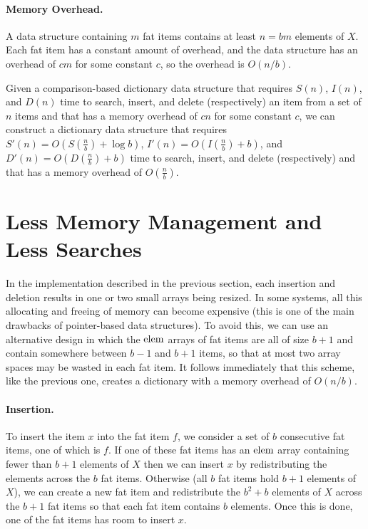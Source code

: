 \documentclass[lotsofwhite]{patmorin}
\begin{document}
\paragraph{Memory Overhead.}

A data structure containing $m$ fat items contains at least $n=bm$
elements of $X$.  Each fat item has a constant amount of overhead, and
the data structure has an overhead of $cm$ for some constant $c$, so
the overhead is $O(n/b)$.

\begin{thm}
Given a comparison-based dictionary data structure that requires
$S(n)$, $I(n)$, and $D(n)$ time to search, insert, and delete
(respectively) an item from a set of $n$ items and that has a memory
overhead of $cn$ for some constant $c$, we can construct a dictionary
data structure that requires $S'(n)=O(S(\frac{n}{b})+\log b)$,
$I'(n)=O(I(\frac{n}{b})+b)$, and $D'(n)=O(D(\frac{n}{b})+b)$ time to
search, insert, and delete (respectively) and that has a memory
overhead of $O(\frac{n}{b})$.
\end{thm}


\section{Less Memory Management and Less Searches}

In the implementation described in the previous section, each
insertion and deletion results in one or two small arrays being
resized.  In some systems, all this allocating and freeing of memory
can become expensive (this is one of the main drawbacks of
pointer-based data structures).  To avoid this, we can use an
alternative design in which the $\mathrm{elem}$ arrays of fat items are all of
size $b+1$ and contain somewhere between $b-1$ and $b+1$ items, so
that at most two array spaces may be wasted in each fat item.  It
follows immediately that this scheme, like the previous one, creates a
dictionary with a memory overhead of $O(n/b)$.

\paragraph{Insertion.}
To insert the item $x$ into the fat item $f$, we consider a set of $b$
consecutive fat items, one of which is $f$.  If one of these fat items
has an $\mathrm{elem}$ array containing fewer than $b+1$ elements of $X$ then
we can insert $x$ by redistributing the elements across the $b$ fat
items.  Otherwise (all $b$ fat items hold $b+1$ elements of $X$), we
can create a new fat item and redistribute the $b^2 + b$ elements of
$X$ across the $b+1$ fat items so that each fat item contains $b$
elements.  Once this is done, one of the fat items has room to insert
$x$.
\end{document}
